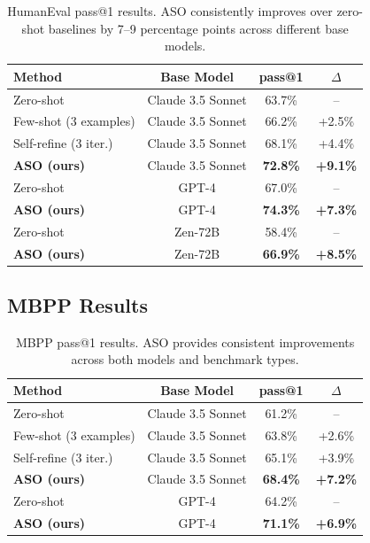 \documentclass[11pt]{article}
\begin{document}
\begin{table}[h]
\centering
\begin{tabular}{lccc}
\toprule
Method & Base Model & pass@1 & $\Delta$ \\
\midrule
Zero-shot & Claude 3.5 Sonnet & 63.7\% & -- \\
Few-shot (3 examples) & Claude 3.5 Sonnet & 66.2\% & +2.5\% \\
Self-refine (3 iter.) & Claude 3.5 Sonnet & 68.1\% & +4.4\% \\
\textbf{ASO (ours)} & Claude 3.5 Sonnet & \textbf{72.8\%} & \textbf{+9.1\%} \\
\midrule
Zero-shot & GPT-4 & 67.0\% & -- \\
\textbf{ASO (ours)} & GPT-4 & \textbf{74.3\%} & \textbf{+7.3\%} \\
\midrule
Zero-shot & Zen-72B & 58.4\% & -- \\
\textbf{ASO (ours)} & Zen-72B & \textbf{66.9\%} & \textbf{+8.5\%} \\
\bottomrule
\end{tabular}
\caption{HumanEval pass@1 results. ASO consistently improves over zero-shot
baselines by 7--9 percentage points across different base models.}
\label{tab:humaneval}
\end{table}

\subsection{MBPP Results}

\begin{table}[h]
\centering
\begin{tabular}{lccc}
\toprule
Method & Base Model & pass@1 & $\Delta$ \\
\midrule
Zero-shot & Claude 3.5 Sonnet & 61.2\% & -- \\
Few-shot (3 examples) & Claude 3.5 Sonnet & 63.8\% & +2.6\% \\
Self-refine (3 iter.) & Claude 3.5 Sonnet & 65.1\% & +3.9\% \\
\textbf{ASO (ours)} & Claude 3.5 Sonnet & \textbf{68.4\%} & \textbf{+7.2\%} \\
\midrule
Zero-shot & GPT-4 & 64.2\% & -- \\
\textbf{ASO (ours)} & GPT-4 & \textbf{71.1\%} & \textbf{+6.9\%} \\
\bottomrule
\end{tabular}
\caption{MBPP pass@1 results. ASO provides consistent improvements across
both models and benchmark types.}
\label{tab:mbpp}
\end{table}
\end{document}
